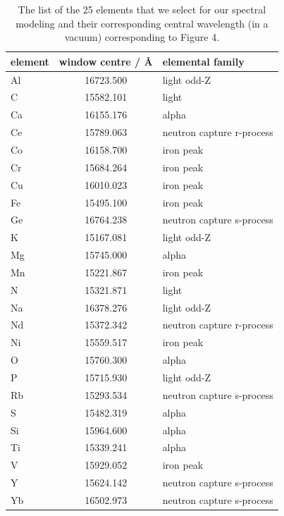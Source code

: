 \documentclass[a4paper,fleqn,usenatbib]{mnras}
\begin{document}
\begin{table}
    \centering
    \caption{The list of the 25 elements that we select for our spectral modeling and their corresponding central wavelength (in a vacuum) corresponding to Figure 4.}
    \label{tab:window_centres}
    \begin{tabular}{lcl}
        \hline
        element & window centre / \AA & elemental family \\
        \hline
        Al & 16723.500 & light odd-Z \\
        C & 15582.101 & light \\
        Ca & 16155.176 & alpha \\
        Ce & 15789.063 & neutron capture r-process \\
        Co & 16158.700 & iron peak \\
        Cr & 15684.264 & iron peak \\
        Cu & 16010.023 & iron peak \\
        Fe & 15495.100 & iron peak \\
        Ge & 16764.238 & neutron capture s-process \\
        K & 15167.081 & light odd-Z \\
        Mg & 15745.000 & alpha \\
        Mn & 15221.867 & iron peak \\
        N & 15321.871 & light \\
        Na & 16378.276 & light odd-Z \\
        Nd & 15372.342 & neutron capture r-process \\
        Ni & 15559.517 & iron peak \\
        O & 15760.300 & alpha \\
        P & 15715.930 & light odd-Z \\
        Rb & 15293.534 & neutron capture s-process \\
        S & 15482.319 & alpha \\
        Si & 15964.600 & alpha \\
        Ti & 15339.241 & alpha \\
        V & 15929.052 & iron peak \\
        Y & 15624.142 & neutron capture s-process \\
        Yb & 16502.973 & neutron capture s-process \\
        \hline
    \end{tabular}
\end{table}
\end{document}
